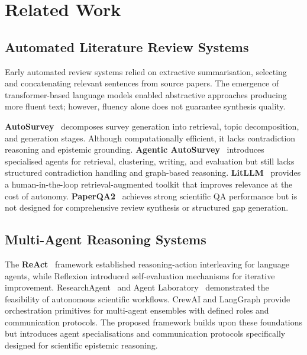\documentclass{llncs}
\begin{document}
\section{Related Work}
\label{sec:related}

\subsection{Automated Literature Review Systems}

Early automated review systems relied on extractive summarisation, selecting
and concatenating relevant sentences from source papers. The emergence of
transformer-based language models enabled abstractive approaches producing
more fluent text; however, fluency alone does not guarantee synthesis quality.

\textbf{AutoSurvey}~\cite{wang2024autosurvey} decomposes survey generation
into retrieval, topic decomposition, and generation stages. Although
computationally efficient, it lacks contradiction reasoning and epistemic
grounding. \textbf{Agentic AutoSurvey}~\cite{wang2025autosurvey2} introduces
specialised agents for retrieval, clustering, writing, and evaluation but still
lacks structured contradiction handling and graph-based reasoning.
\textbf{LitLLM}~\cite{agarwal2024litllm} provides a human-in-the-loop
retrieval-augmented toolkit that improves relevance at the cost of autonomy.
\textbf{PaperQA2}~\cite{skarlinski2024paperqa2} achieves strong
scientific QA performance but is not designed for comprehensive review
synthesis or structured gap generation.

\subsection{Multi-Agent Reasoning Systems}

The \textbf{ReAct}~\cite{yao2023react} framework established reasoning-action
interleaving for language agents, while Reflexion introduced self-evaluation
mechanisms for iterative improvement. ResearchAgent~\cite{baek2024researchagent}
and Agent Laboratory~\cite{schmidgall2025agentlab} demonstrated the feasibility
of autonomous scientific workflows. CrewAI and LangGraph provide orchestration
primitives for multi-agent ensembles with defined roles and communication
protocols. The proposed framework builds upon these foundations but introduces
agent specialisations and communication protocols specifically designed for
scientific epistemic reasoning.
\end{document}
